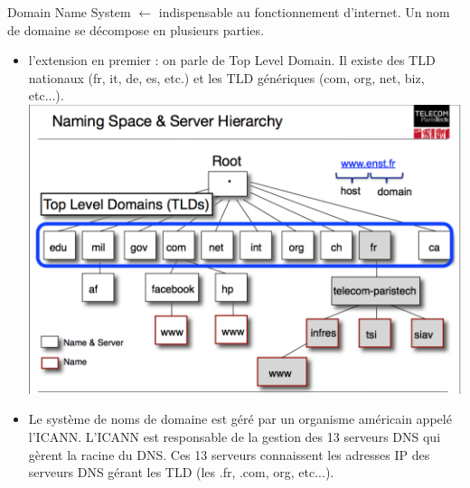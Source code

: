 \documentclass[a4paper,9pt, twocolumn]{article}
\begin{document}
	Domain Name System $\leftarrow$ indispensable au fonctionnement d'internet.
	Un nom de domaine se décompose en plusieurs parties.
	\begin{itemize}
		\item l'extension en premier : on parle de Top Level Domain.
			Il existe des TLD nationaux (fr, it, de, es, etc.) et les TLD génériques (com, org, net, biz, etc...).
			\includegraphics[scale=0.45]{dns.png}
		\item Le système de noms de domaine est géré par un organisme américain appelé l'ICANN.
			L'ICANN est responsable de la gestion des 13 serveurs DNS qui gèrent la racine du DNS.
			Ces 13 serveurs connaissent les adresses IP des serveurs DNS gérant les TLD (les .fr, .com, org, etc...).
	\end{itemize}
\end{document}
